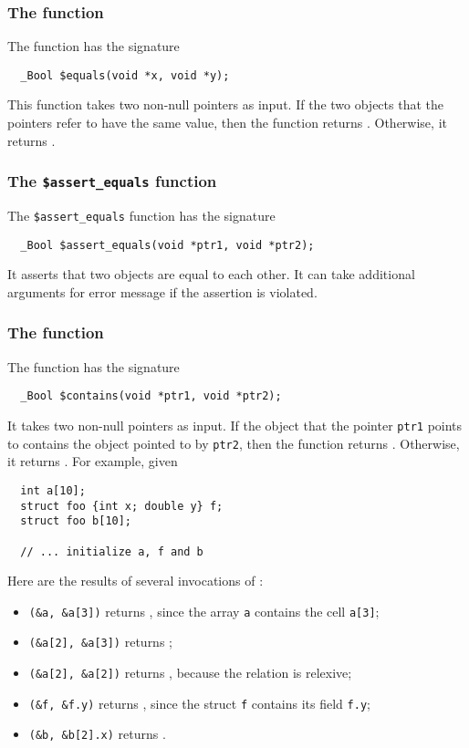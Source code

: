 \subsubsection{The \cequals{} function}

The \cequals{} function has the signature
\begin{verbatim}
  _Bool $equals(void *x, void *y);
\end{verbatim}

This function takes two non-null pointers as input. If  the two objects that the pointers refer to have the same value, then the
function returns \ctrue. Otherwise, it returns \cfalse.

\subsubsection{The \texttt{\$assert\_equals} function}
The \texttt{\$assert\_equals} function has the signature
\begin{verbatim}
  _Bool $assert_equals(void *ptr1, void *ptr2);
\end{verbatim}
It asserts that two objects are equal to each other. It can take additional arguments 
for error message if the assertion is violated.

\subsubsection{The \ccontains{} function}
The function \ccontains{} has the signature
\begin{verbatim}
  _Bool $contains(void *ptr1, void *ptr2);
\end{verbatim}
It takes two non-null pointers as input. If  the object that the pointer \texttt{ptr1} points to contains the object pointed to by \texttt{ptr2},  then the
function returns \ctrue. Otherwise, it returns \cfalse. For example, given 
\begin{verbatim}
  int a[10];
  struct foo {int x; double y} f;
  struct foo b[10];

  // ... initialize a, f and b
\end{verbatim}

Here are the results of several invocations of  \ccontains:
\begin{itemize}
\item \texttt{\ccontains(\&a, \&a[3])} returns  \ctrue, since  the array \texttt{a} contains the cell \texttt{a[3]};
\item \texttt{\ccontains(\&a[2], \&a[3])} returns \cfalse;
\item \texttt{\ccontains(\&a[2], \&a[2])} returns \ctrue, because the relation is relexive;
\item  \texttt{\ccontains(\&f, \&f.y)} returns \ctrue, since the struct \texttt{f} contains its field \texttt{f.y};
\item \texttt{\ccontains(\&b, \&b[2].x)} returns \ctrue.
\end{itemize}

